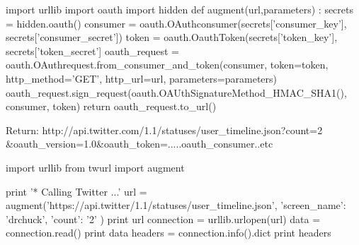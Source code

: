 \documentclass[a4paper,12pt]{report}
\begin{document}
\begin{tcolorbox}
\begin{python}
import urllib
import oauth
import hidden
	def augment(url,parameters) :
	secrets = hidden.oauth()
	consumer = oauth.OAuthconsumer(secrets['consumer_key'], 
	secrets['consumer_secret'])
	token = oauth.OauthToken(secrets['token_key'], 
	secrets['token_secret']
	oauth_request = oauth.OAuthrequest.from_consumer_and_token(consumer, 
	token=token, http_method='GET', http_url=url, parameters=parameters)
	oauth_request.sign_request(oauth.OAUthSignatureMethod_HMAC_SHA1(), 
	consumer, token)
	return oauth_request.to_url()
\end{python}
\end{tcolorbox}
Return: http://api.twitter.com/1.1/statuses/user\_timeline.json?count=2\\
\&oauth\_version=1.0\&oauth\_token=.....oauth\_consumer..etc

\begin{tcolorbox}
\begin{python}
import urllib
from twurl import augment

print '* Calling Twitter ...'
url = augment('https://api.twitter/1.1/statuses/user_timeline.json',
 {'screen_name': 'drchuck', 'count': '2'} )
print url
connection = urllib.urlopen(url)
data = connection.read()
print data
headers = connection.info().dict
print headers
\end{python}
\end{tcolorbox}
\end{document}
